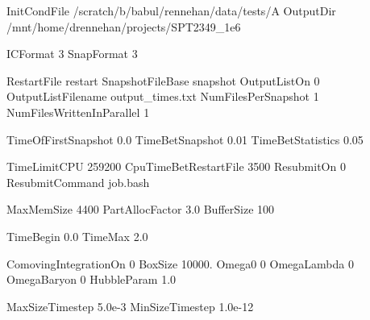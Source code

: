 
InitCondFile /scratch/b/babul/rennehan/data/tests/A
OutputDir     /mnt/home/drennehan/projects/SPT2349_1e6

ICFormat    3  %
SnapFormat  3  %

RestartFile                 restart
SnapshotFileBase            snapshot
OutputListOn                0  %
OutputListFilename          output_times.txt  %
NumFilesPerSnapshot         1
NumFilesWrittenInParallel   1  %

TimeOfFirstSnapshot     0.0
TimeBetSnapshot         0.01 
TimeBetStatistics       0.05 

TimeLimitCPU            259200  %
CpuTimeBetRestartFile   3500    %
ResubmitOn              0
ResubmitCommand         job.bash

MaxMemSize          4400    %
PartAllocFactor     3.0     %
BufferSize          100     %

TimeBegin   0.0    %
TimeMax     2.0    %

ComovingIntegrationOn   0       %
BoxSize                 10000.  %
Omega0                  0       %
OmegaLambda             0       %
OmegaBaryon             0       %
HubbleParam             1.0     %

MaxSizeTimestep         5.0e-3   %
MinSizeTimestep         1.0e-12 %


